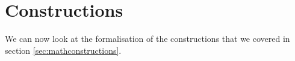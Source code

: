 \section{Constructions}

We can now look at the formalisation of the constructions that we covered in section \ref{sec:mathconstructions}.



